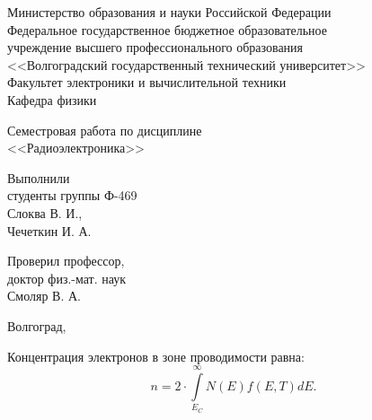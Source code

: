 \documentclass[14pt,a4paper]{extarticle}
\begin{document}
  \begin{titlepage}
    \singlespacing
    \begin{center}
      Министерство образования и науки Российской Федерации \\
      Федеральное государственное бюджетное образовательное \\
      учреждение высшего профессионального образования \\
      <<Волгоградский государственный технический университет>> \\
      Факультет электроники и вычислительной техники \\
      Кафедра физики
    \end{center}

    \vspace{9em}

    \begin{center}
      \large Семестровая работа по дисциплине \\
      <<Радиоэлектроника>>
    \end{center}

    \vspace{5em}

    \begin{flushright}
      \begin{minipage}{.40\textwidth}
        Выполнили \\
        студенты группы Ф-469 \\
        Слоква В. И., \\
        Чечеткин И. А. \\

        \vspace{1em}

        Проверил профессор, \\
        доктор физ.-мат. наук \\
        Смоляр В. А.
      \end{minipage}
    \end{flushright}

    \vspace{\fill}

    \begin{center}
      Волгоград, \the\year
    \end{center}
  \end{titlepage}

  \setcounter{page}{2}
  \tableofcontents
  \newpage

  Концентрация электронов в зоне проводимости равна:
  \begin{equation}
    n = 2\cdot\int\limits_{E_C}^\infty N(E) f(E, T) dE.
    \label{G1.9}
  \end{equation}
  
\end{document}

